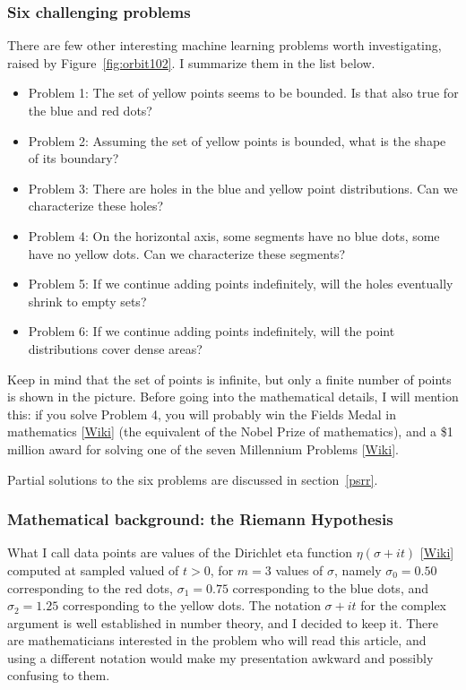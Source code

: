 \documentclass[oneside,10pt]{book}
\begin{document}
\subsubsection{Six challenging problems}

\noindent There are few other interesting machine learning problems worth investigating, raised  by Figure~\ref{fig:orbit102}. I summarize them in the list below.
\begin{itemize}
\item Problem 1: The set of yellow points seems to be bounded. Is that also true for the blue and red dots?
\item Problem 2: Assuming the set of yellow points is bounded, what is the shape of its boundary?
\item Problem 3: There are holes in the blue and yellow point distributions. Can we characterize these holes?
\item Problem 4: On the horizontal axis, some segments have no blue dots, some have no yellow dots. Can we characterize these segments?
\item Problem 5: If we continue adding points indefinitely, will the holes eventually shrink to empty sets?
\item Problem 6: If we continue adding points indefinitely, will the point distributions cover dense areas?
\end{itemize}

\noindent Keep in mind that the set of points is infinite, but only a finite number of points is shown in the picture. Before going into the mathematical details, I
 will mention this: if you solve Problem 4, you will probably win the Fields Medal in mathematics [\href{https://en.wikipedia.org/wiki/Fields_Medal}{Wiki}] (the equivalent of the Nobel Prize of mathematics), and a \$1 million award for solving one of the seven Millennium Problems [\href{https://www.claymath.org/millennium-problems/riemann-hypothesis}{Wiki}].

\noindent Partial solutions to the six problems are discussed in section~\ref{psrr}.


\subsubsection{Mathematical background: the Riemann Hypothesis}

What I call data points are values of the Dirichlet eta function $\eta(\sigma+it)$ [\href{https://en.wikipedia.org/wiki/Dirichlet_eta_function}{Wiki}] computed at sampled valued of $t>0$,  for $m=3$ values of $\sigma$, namely
$\sigma_0=0.50$ corresponding to the red dots, $\sigma_1=0.75$ corresponding to the blue dots, and $\sigma_2=1.25$ corresponding to the yellow dots.
The notation $\sigma+it$ for the complex argument is well established in number theory, and I decided to keep it. There are mathematicians interested in the
problem who will read this article, and using a different notation would make my presentation awkward and possibly confusing to them.
\end{document}
